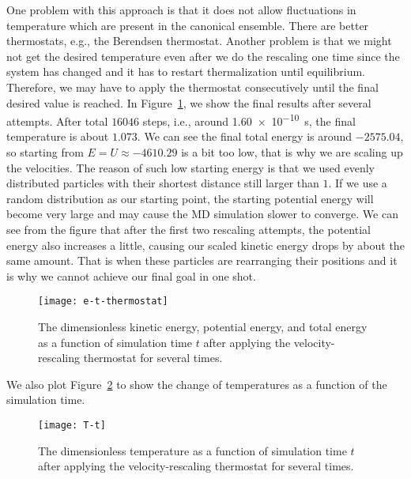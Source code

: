 One problem with this approach is that it does not
allow fluctuations in temperature which are present in the canonical ensemble.
There are better thermostats, e.g., the Berendsen thermostat.
Another problem is that we might not get the desired temperature even after we do the
rescaling one time since the system has changed and it has to restart thermalization
until equilibrium. Therefore, we may have to apply the thermostat consecutively
until the final desired value is reached.
In Figure~\ref{fig:md-thermostat}, we show the final results after several attempts.
After total $16046$ steps, i.e., around \qty{1.60e-10}{\second}, the final temperature is
about $1.073$.
We can see the final total energy is around $-2575.04$, so starting from
$E = U \approx -4610.29$ is a bit too low, that is why we are scaling up the velocities.
The reason of such low starting energy is that we used evenly distributed particles
with their shortest distance still larger than $1$. If we use a random distribution
as our starting point, the starting potential energy will become very large and
may cause the MD simulation slower to converge.
We can see from the figure that after the first two rescaling attempts, the potential
energy also increases a little, causing our scaled kinetic energy drops by about the
same amount. That is when these particles are rearranging their positions and
it is why we cannot achieve our final goal in one shot.

\begin{figure}
    \centering
    \texttt{[image: e-t-thermostat]}
    \caption{The dimensionless kinetic energy, potential energy, and total energy
        as a function of simulation time $t$ after applying the velocity-rescaling
        thermostat for several times.}
    \label{fig:md-thermostat}
\end{figure}

We also plot Figure~\ref{fig:T-t} to show the change of temperatures as a function
of the simulation time.

\begin{figure}
    \centering
    \texttt{[image: T-t]}
    \caption{The dimensionless temperature as a function of simulation time $t$ after
        applying the velocity-rescaling thermostat for several times.}
    \label{fig:T-t}
\end{figure}
